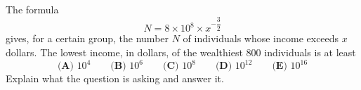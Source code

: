 The formula
\[N=8\times10^{8}\times x^{-\dfrac32}\]
gives, for a certain group, the number $N$ of individuals whose income exceeds $x$ dollars. The lowest income, in dollars, of the wealthiest $800$ individuals is at least
\[\textbf{(A) }10^4\qquad\textbf{(B) }10^6\qquad\textbf{(C) }10^8\qquad\textbf{(D) }10^{12}\qquad\textbf{(E) }10^{16}\]
Explain what the question is asking and answer it.
